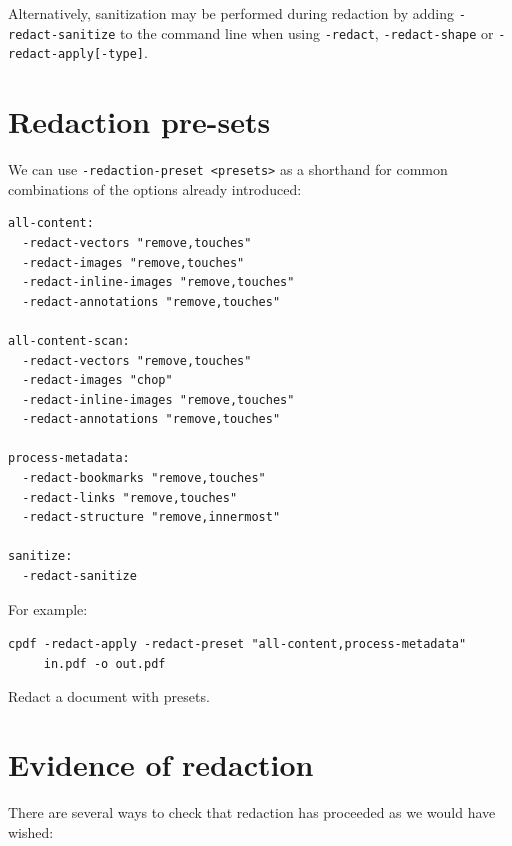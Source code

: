 \documentclass{book}
\begin{document}
\medskip

\noindent Alternatively, sanitization may be performed during redaction by adding \texttt{-redact-sanitize} to the command line when using \texttt{-redact}, \texttt{-redact-shape} or \texttt{-redact-apply[-type]}.

\section{Redaction pre-sets}

We can use \texttt{-redaction-preset <presets>} as a shorthand for common combinations of the options already introduced:

\begin{verbatim}
all-content:
  -redact-vectors "remove,touches"
  -redact-images "remove,touches"
  -redact-inline-images "remove,touches"
  -redact-annotations "remove,touches"

all-content-scan:
  -redact-vectors "remove,touches"
  -redact-images "chop"
  -redact-inline-images "remove,touches"
  -redact-annotations "remove,touches"

process-metadata:
  -redact-bookmarks "remove,touches"
  -redact-links "remove,touches"
  -redact-structure "remove,innermost"
  
sanitize:
  -redact-sanitize
\end{verbatim}

\noindent For example:

  \begin{framed}
    \noindent\small\verb!cpdf -redact-apply -redact-preset "all-content,process-metadata"!\\
    \noindent\small\verb!     in.pdf -o out.pdf!

    \vspace{2.5mm}
    \noindent Redact a document with presets.
  \end{framed}

\section{Evidence of redaction}

There are several ways to check that redaction has proceeded as we would have wished:
\end{document}
